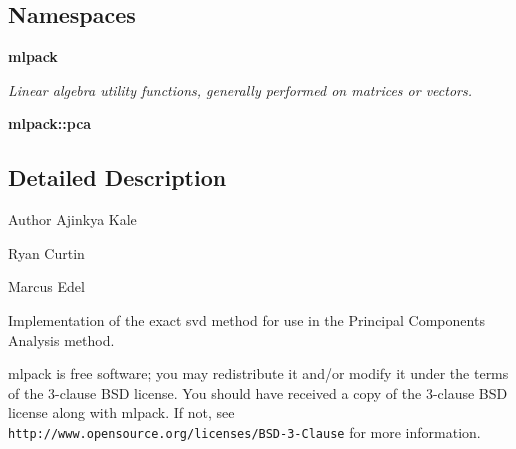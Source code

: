 \subsection*{Namespaces}
\begin{DoxyCompactItemize}
\item 
 {\bf mlpack}
\begin{DoxyCompactList}\small\item\em Linear algebra utility functions, generally performed on matrices or vectors. \end{DoxyCompactList}\item 
 {\bf mlpack\+::pca}
\end{DoxyCompactItemize}


\subsection{Detailed Description}
\begin{DoxyAuthor}{Author}
Ajinkya Kale 

Ryan Curtin 

Marcus Edel
\end{DoxyAuthor}
Implementation of the exact svd method for use in the Principal Components Analysis method.

mlpack is free software; you may redistribute it and/or modify it under the terms of the 3-\/clause B\+SD license. You should have received a copy of the 3-\/clause B\+SD license along with mlpack. If not, see {\tt http\+://www.\+opensource.\+org/licenses/\+B\+S\+D-\/3-\/\+Clause} for more information. 